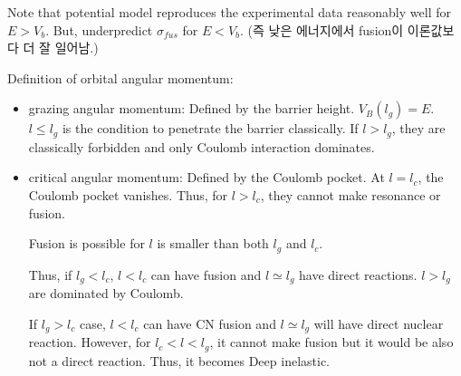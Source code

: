 \documentclass[11pt]{book}
\begin{document}
Note that potential model reproduces the experimental data
reasonably well for $E > V_b$. But, underpredict $\sigma_{fus}$
for $E< V_b$. (즉  낮은 에너지에서 fusion이 이론값보다 더 잘 일어남.)


Definition of orbital angular momentum:
\begin{itemize}
	\item grazing angular momentum: Defined by the barrier height. $V_B(l_g)=E$. 
	      $l\leq l_g$ is the condition to penetrate the barrier classically. 
	      If $l> l_g$, they are classically forbidden and only Coulomb interaction dominates. 
	\item critical angular momentum: Defined by the Coulomb pocket. At $l=l_c$, the Coulomb pocket vanishes.
	      Thus, for $l> l_c$, they cannot make resonance or fusion.
	      
	      Fusion is possible for $l$ is smaller than both $l_g$ and $l_c$. 
	      
	      Thus, if $l_g< l_c$, $l<l_c$ can have fusion 
	      and $l\simeq l_g$  have direct reactions. $l> l_g$ are dominated by Coulomb.  
	      
	      If $l_g > l_c$ case, $l < l_c$ can have CN fusion and 
	      $l\simeq l_g$ will have direct nuclear reaction. 
	      However, for $l_c < l < l_g$, it cannot make fusion 
	      but it would be also not a direct reaction. Thus, it becomes
	      Deep inelastic. 
	      
\end{itemize}
\end{document}
